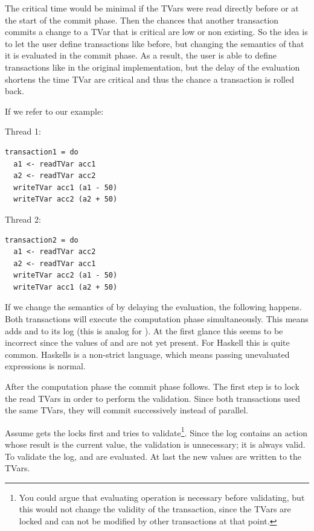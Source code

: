 The critical time would be minimal if the TVars were read directly before or at the start of the commit phase.
Then the chances that another transaction commits a change to a TVar that is critical are low or non
existing. So the idea is to let the user define transactions like before, but changing the semantics of 
 that it is evaluated in the commit phase. As a result, the user is able to define transactions like in
the original implementation, but the delay of the evaluation shortens the time TVar are critical and thus
the chance a transaction is rolled back. 

If we refer to our example: 
\par\noindent
\begin{minipage}[t]{.45\textwidth}
Thread 1:
\begin{lstlisting}[frame=lrtb]
transaction1 = do
  a1 <- readTVar acc1
  a2 <- readTVar acc2
  writeTVar acc1 (a1 - 50)
  writeTVar acc2 (a2 + 50)
\end{lstlisting}
\end{minipage}
\hfill
\begin{minipage}[t]{.45\textwidth}
Thread 2:
\begin{lstlisting}[frame=lrtb]
transaction2 = do 
  a1 <- readTVar acc2
  a2 <- readTVar acc1
  writeTVar acc2 (a1 - 50)
  writeTVar acc1 (a2 + 50)
\end{lstlisting}
\end{minipage}

If we change the semantics of  by delaying the evaluation, the following happens.
Both transactions will execute the computation phase simultaneously. This means  adds
 and  to its log (this is analog for ).
At the first glance this seems to be incorrect since the values of  and  are not yet present.
For Haskell this is quite common. Haskells is a non-strict language, which means passing unevaluated expressions
is normal. 

After the computation phase the commit phase follows. The first step is to lock the read TVars in order to 
perform the validation. Since both transactions used the same TVars, they will commit successively instead of
parallel. 

Assume  gets the locks first and tries to validate\footnote{You could argue that 
evaluating  operation is necessary before validating, but this would not change the validity of the 
transaction, since the TVars are locked and can not be modified by other transactions at that point.}. 
Since the log contains an action whose result is the current value, the validation is unnecessary; it is always valid.
To validate the log,  and  are evaluated. At last the new values are written to the TVars.

